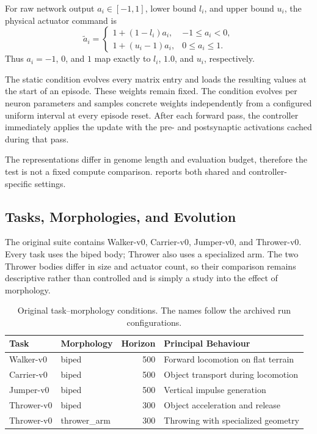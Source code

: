 For raw network output $a_i\in[-1,1]$, lower bound $l_i$, and upper bound $u_i$, the physical actuator command is
\begin{equation}
  \widetilde{a}_i=
  \begin{cases}
    1+(1-l_i)a_i, & -1\leq a_i<0,\\
    1+(u_i-1)a_i, & 0\leq a_i\leq 1.
  \end{cases}
  \label{eq:action-mapping}
\end{equation}
Thus $a_i=-1$, $0$, and $1$ map exactly to $l_i$, $1.0$, and $u_i$, respectively.

The static condition evolves every matrix entry and loads the resulting values at the start of an episode. These weights remain fixed. The \nchl{} condition evolves per neuron parameters and samples concrete weights independently from a configured uniform interval at every episode reset. After each forward pass, the controller immediately applies the update with the pre- and postsynaptic activations cached during that pass.

The representations differ in genome length and evaluation budget, therefore the test is not a fixed compute comparison.  reports both shared and controller-specific settings.

\subsection{Tasks, Morphologies, and Evolution}

The original suite contains Walker-v0, Carrier-v0, Jumper-v0, and Thrower-v0. Every task uses the biped body; Thrower also uses a specialized arm. The two Thrower bodies differ in size and actuator count, so their comparison remains descriptive rather than controlled and is simply a study into the effect of morphology.

\begin{table}[htbp]
  \centering
  \caption{Original task--morphology conditions. The names follow the archived run configurations.}
  \label{tab:original-strata}
  \begin{tabularx}{\textwidth}{@{}llrX@{}}
    \toprule
    Task & Morphology & Horizon & Principal Behaviour \\
    \midrule
    Walker-v0 & biped & 500 & Forward locomotion on flat terrain \\
    Carrier-v0 & biped & 500 & Object transport during locomotion \\
    Jumper-v0 & biped & 500 & Vertical impulse generation \\
    Thrower-v0 & biped & 300 & Object acceleration and release \\
    Thrower-v0 & thrower\_arm & 300 & Throwing with specialized geometry \\
    \bottomrule
  \end{tabularx}
\end{table}

